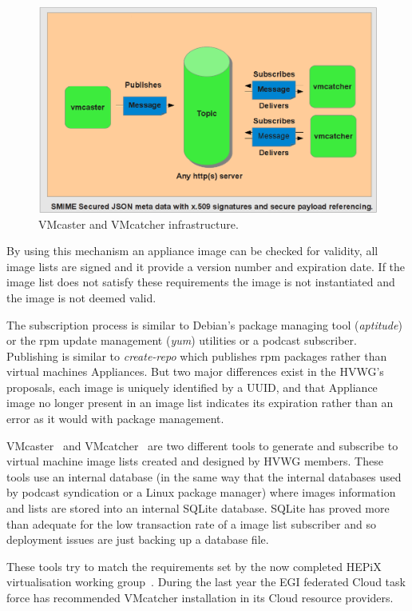 \documentclass{cai}
\begin{document}
\begin{figure}
\centering
\includegraphics[width=1\textwidth]{vmcaster_vmcatcher.png}
\caption{VMcaster and VMcatcher infrastructure.}
\label{fig:infrastructure}
\end{figure}

By using this mechanism an appliance image can be checked for validity, all image lists are signed and it provide a version number and expiration date. 
If the image list does not satisfy these requirements the image is not instantiated and the image is not deemed valid.

The subscription process is similar to Debian's package managing tool (\textit{aptitude}) or the rpm update management (\textit{yum}) utilities or a podcast subscriber. 
Publishing is similar to \textit{create-repo} which publishes rpm packages rather than virtual machines Appliances. 
But two major differences exist in the HVWG's proposals, each image is uniquely identified by a UUID, and that Appliance image no longer present in an image list indicates its expiration rather than an error as it would with package management.


VMcaster~\cite{vmcaster} and VMcatcher~\cite{vmcatcher} are two different tools to generate and subscribe to virtual machine image lists created and designed by HVWG members.
These tools use an internal database (in the same way that the internal databases used by podcast syndication or a Linux package manager) where images information and lists are stored into an internal SQLite database.
SQLite has proved more than adequate for the low transaction rate of a image list subscriber and so deployment issues are just backing up a database file.

These tools try to match the requirements set by the now completed HEPiX virtualisation working group~\cite{hepix}.
During the last year the EGI federated Cloud task force has recommended VMcatcher installation in its Cloud resource providers.
\end{document}

